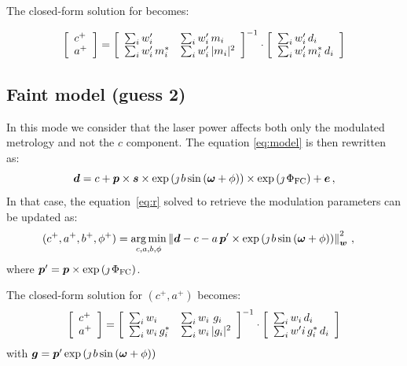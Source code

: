 \documentclass[a4paper,11pt,twoside]{scrartcl}
\begin{document}
The closed-form solution for  becomes:

\begin{equation}
    \left[\begin{array}{l}
    c^+\\
    a^+
    \end{array}\right] =\left[\begin{array}{ll}
        \sum_i w'_i & \sum_i w'_i\, m_i\\
        \sum_i   w'_i\,m_i^* &  \sum_i w'_i\, \vert m_i\vert^2
        \end{array}\right]^{-1} \cdot
    \left[\begin{array}{l}
    \sum_i w'_i\,d_i\\
    \sum_i w'_i\,m_i^*\,d_i\\
    \end{array}\right] 
\end{equation}


\subsection{Faint model (guess 2)}
In this mode we consider that the laser power affects both only the modulated metrology and not the $c$ component. The equation \ref{eq:model} is then rewritten as:
\begin{equation}
    \boldsymbol{d} =   c +\boldsymbol{p} \times \boldsymbol{s} \times  \exp\left( \jmath \, b \sin\left( \boldsymbol{\omega} + \phi\right)\right)\times\exp\left(\jmath\,\Phi_\textrm{FC}\right)+  \boldsymbol{e}\,,\label{eq:modelfaint}
\end{equation}
In that case, the equation~\ref{eq:r} solved to retrieve the modulation parameters can be updated   as:
\begin{align}
    (c^+, a^+, b^+, \phi^+) &= \argmin_{c,a,b,\phi} \Norm{\V{d} -  c - a\, \V{p}' \times  \exp\left( \jmath \, b \sin\left( \V{\omega} + \phi\right)\right) }_{\V{w}}^2\,,
\end{align}
where $\boldsymbol{p}' = \boldsymbol{p}\times\exp\left(\jmath\,\Phi_\textrm{FC}\right)$.

The closed-form solution for $(c^+, a^+)$  becomes:
\begin{equation}
    \left[\begin{array}{l}
    c^+\\
    a^+
    \end{array}\right] =\left[\begin{array}{ll}
        \sum_i w_i & \sum_i w_i\, \, g_i\\
        \sum_i   w_i\, g_i^* &  \sum_i w_i\, \vert g_i\vert^2
        \end{array}\right]^{-1} \cdot
    \left[\begin{array}{l}
    \sum_i w_i\,d_i\\
    \sum_i w'i\, g_i^*\,d_i\\
    \end{array}\right] 
\end{equation}
with $\boldsymbol{g} =   \boldsymbol{p}'  \exp\left( \jmath \, b \sin\left( \boldsymbol{\omega} + \phi\right)\right)$
\end{document}
